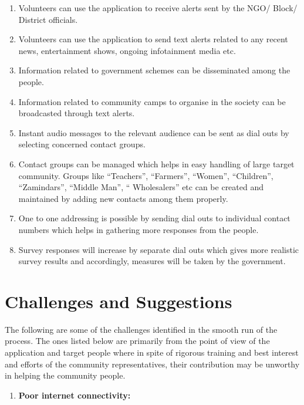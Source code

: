 \begin{itemize}
\begin {enumerate}
\item Volunteers can use the application to receive alerts sent by the NGO/ Block/ District officials.
\item Volunteers can use the application to send text alerts related to any recent news, entertainment shows, ongoing infotainment media  etc.
\item Information related to government schemes can be disseminated among the people.
\item Information related to community camps to organise in the society can be broadcasted through text alerts.
\item Instant audio messages to the relevant audience can be sent as dial outs by selecting concerned contact groups.
\item Contact groups can be managed which helps in easy handling of large target community. Groups like “Teachers”, “Farmers”, “Women”, “Children”, “Zamindars”, “Middle Man”, “ Wholesalers” etc can be created and maintained by adding new contacts among them properly.
\item One to one addressing is possible by sending dial outs to individual contact numbers which helps in gathering more responses from the people.
\item Survey responses will increase by separate dial outs which gives more realistic  survey results and accordingly, measures will be taken by the government.

\end {enumerate}

\section {Challenges and Suggestions}

The following are some of the challenges identified in the smooth run of the process. The ones listed below are primarily from the point of view of the application and target people where in spite of rigorous training and best interest and efforts of the community representatives, their contribution may be unworthy in helping the community people.

\begin {enumerate}

\item \textbf{ Poor internet connectivity:}


\end{enumerate}
\end{itemize}
